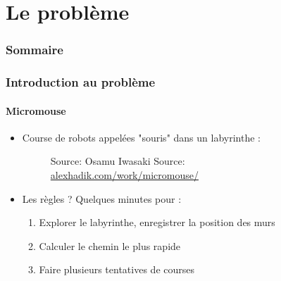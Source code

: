 \section{Le problème}

\begin{frame}
\frametitle{Sommaire}
    \tableofcontents[currentsection]
\end{frame}

\begin{frame}
\frametitle{Introduction au problème}
\framesubtitle{Micromouse}

\begin{itemize}
	\item Course de robots appelées "souris" dans un labyrinthe :

    \begin{figure}
        \def\stackalignment{r}
           {\sources
            Source: Osamu Iwasaki}
    \hfill
        \def\stackalignment{r}
           {\sources
            Source: \url{alexhadik.com/work/micromouse/}}
	\end{figure}
	\item	<2-> Les règles ? Quelques minutes pour :
    \begin{enumerate}
        \item Explorer le labyrinthe, enregistrer la position des murs
        \item Calculer le chemin le plus rapide
        \item Faire plusieurs tentatives de courses
    \end{enumerate}
\end{itemize}

\end{frame}

